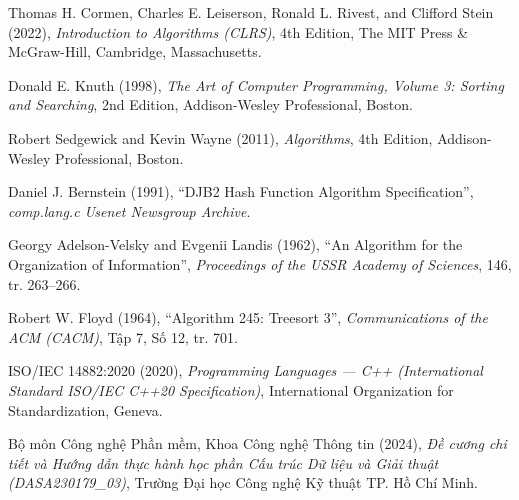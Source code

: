 \documentclass[14pt,a4paper]{extarticle}
\begin{document}
\begin{enumerate}[label={[\arabic*]}, leftmargin=*, itemsep=6pt, parsep=0pt, topsep=4pt]
    \item Thomas H. Cormen, Charles E. Leiserson, Ronald L. Rivest, and Clifford Stein (2022), \textit{Introduction to Algorithms (CLRS)}, 4th Edition, The MIT Press \& McGraw-Hill, Cambridge, Massachusetts.
    
    \item Donald E. Knuth (1998), \textit{The Art of Computer Programming, Volume 3: Sorting and Searching}, 2nd Edition, Addison-Wesley Professional, Boston.
    
    \item Robert Sedgewick and Kevin Wayne (2011), \textit{Algorithms}, 4th Edition, Addison-Wesley Professional, Boston.
    
    \item Daniel J. Bernstein (1991), ``DJB2 Hash Function Algorithm Specification'', \textit{comp.lang.c Usenet Newsgroup Archive}.
    
    \item Georgy Adelson-Velsky and Evgenii Landis (1962), ``An Algorithm for the Organization of Information'', \textit{Proceedings of the USSR Academy of Sciences}, 146, tr. 263--266.
    
    \item Robert W. Floyd (1964), ``Algorithm 245: Treesort 3'', \textit{Communications of the ACM (CACM)}, Tập 7, Số 12, tr. 701.
    
    \item ISO/IEC 14882:2020 (2020), \textit{Programming Languages --- C++ (International Standard ISO/IEC C++20 Specification)}, International Organization for Standardization, Geneva.
    
    \item Bộ môn Công nghệ Phần mềm, Khoa Công nghệ Thông tin (2024), \textit{Đề cương chi tiết và Hướng dẫn thực hành học phần Cấu trúc Dữ liệu và Giải thuật (DASA230179\_03)}, Trường Đại học Công nghệ Kỹ thuật TP. Hồ Chí Minh.
\end{enumerate}
\end{document}
